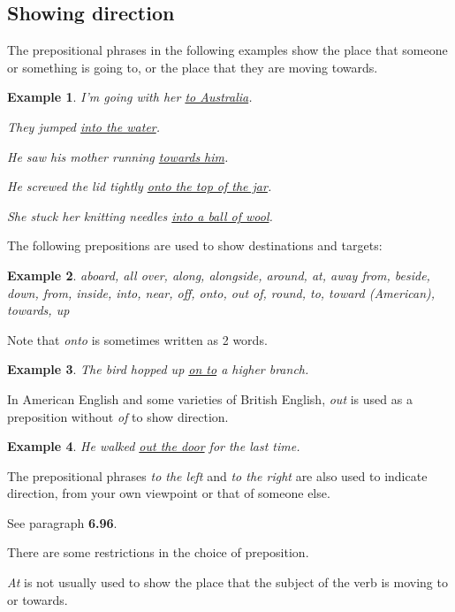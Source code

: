 \documentclass[oneside]{book}
\numberwithin{equation}{section}
\newtheorem{example}{Example}[section]
\begin{document}
\subsection{Showing direction}
\noindent{} The prepositional phrases in the following examples show the place that someone or something is going to, or the place that they are moving towards.
\begin{example}
    I'm going with her \underline{to Australia}.
    
    They jumped \underline{into the water}.
    
    He saw his mother running \underline{towards him}.
    
    He screwed the lid tightly \underline{onto the top of the jar}.
    
    She stuck her knitting needles \underline{into a ball of wool}.
\end{example}
%
\noindent{} The following prepositions are used to show destinations and targets:
\begin{example}
    aboard, all over, along, alongside, around, at, away from, beside, down, from, inside, into, near, off, onto, out of, round, to, toward \emph{(American)}, towards, up
\end{example}
Note that \textit{onto} is sometimes written as 2 words.
\begin{example}
    The bird hopped up \underline{on to} a higher branch.
\end{example}
In American English and some varieties of British English, \textit{out} is used as a preposition without \textit{of} to show direction.
\begin{example}
    He walked \underline{out the door} for the last time.
\end{example}
The prepositional phrases \textit{to the left} and \textit{to the right} are also used to indicate direction, from your own viewpoint or that of someone else.

See paragraph \textbf{6.96}.

%
\noindent{} There are some restrictions in the choice of preposition.

%
\textit{At} is not usually used to show the place that the subject of the verb is moving to or towards.
\end{document}

